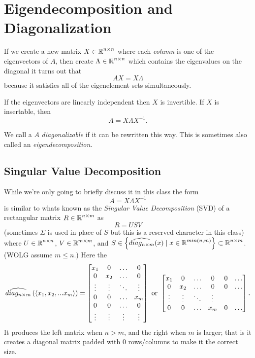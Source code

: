 \section{Eigendecomposition and Diagonalization}
If we create a new matrix $X\in\operatorname{\mathbb{R}}^{n\times n}$ where each \textit{column} is one of the eigenvectors of $A$, 
then create $\Lambda\in\operatorname{\mathbb{R}}^{n\times n}$ which contains the eigenvalues on the diagonal 
it turns out that 
\[ AX = X\Lambda \]
because it satisfies all of the eigenelement sets simultaneously. 

If the eigenvectors are linearly independent then $X$ is invertible. 
If $X$ is insertable, then 
\[ A = X\Lambda X^{-1}.\]

We call a $A$ \emph{diagonalizable} if it can be rewritten this way. 
This is sometimes also called an \emph{eigendecomposition}.

\subsection{Singular Value Decomposition}
While we're only going to briefly discuss it in this class
the form \[ A = X\Lambda X^{-1}\]
is similar to whats known as the \emph{Singular Value Decomposition} (SVD)
of a rectangular matrix $R\in\operatorname{\mathbb{R}}^{n\times m}$
as 
\[R=USV\]
 (sometimes $\Sigma$ is used in place of $S$ but this is a reserved character in this class) 
 where $U\in\operatorname{\mathbb{R}}^{n\times n}$, $V\in\operatorname{\mathbb{R}}^{m\times m}$, 
 and $S\in\left\{\widehat{diag_{n\times m}}(x) \mid x\in\operatorname{\mathbb{R}}^{min(n,m)}\right\}\subset\operatorname{\mathbb{R}}^{n\times m}$. 
 (WOLG assume $m \le n$.)
 Here the \[\widehat{diag_{n\times m}}\left(\left\langle x_1,x_2,...x_m\right\rangle\right) = 
 \begin{bmatrix}x_1 & 0 & \hdots & 0\\0 & x_2 & \hdots & 0\\\vdots&\vdots&\ddots&\vdots\\0 & 0 & \hdots & x_m\\0 & 0 & \hdots &0\\\vdots&\vdots&\vdots&\vdots\\\end{bmatrix} \textnormal{ or }
 \begin{bmatrix}x_1 & 0 & \hdots & 0 & 0 & \hdots\\0 & x_2 & \hdots & 0 & 0 & \hdots\\\vdots&\vdots&\ddots&\vdots\\0 & 0 & \hdots & x_m & 0 & \hdots\\\end{bmatrix}
 .\] 
 It produces the left matrix when $n>m$, and the right when $m$ is larger; 
 that is it creates a diagonal matrix padded with 0 rows/columns to make it the correct size.
 
